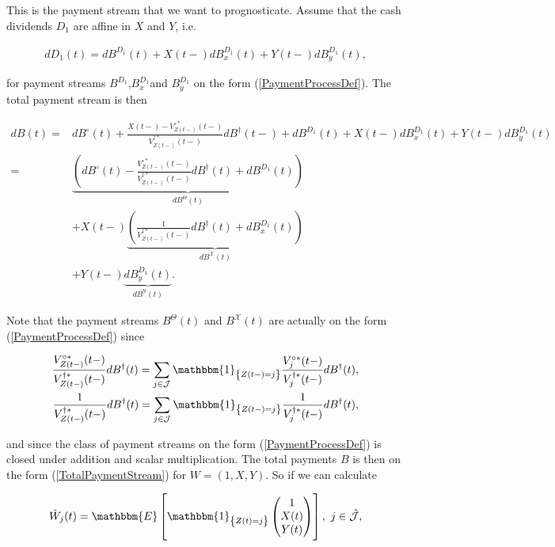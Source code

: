 \documentclass{article}
\newcommand{\1}[1]{\mathbbm{1}_{\left\lbrace #1 \right\rbrace}}
\newcommand{\expec}[1][def]{\mathbbm{E} \left[ #1 \right]}
\theoremstyle{break}
\theoremstyle{remark}
\numberwithin{equation}{section}
\begin{document}
This is the payment stream that we want to prognosticate. Assume that the cash dividends $D_1$ are affine in $X$ and $Y$, i.e.

\begin{align} \label{LinearCashDiv}
dD_1(t) = dB^{D_1}(t) + X(t-) dB_x^{D_1}(t) + Y(t-)dB_y^{D_1}(t),
\end{align}

for payment streams $B^{D_1}$,$B_x^{D_1}$and $B_y^{D_1}$ on the form (\ref{PaymentProcessDef}). The total payment stream is then

\begin{align}
dB(t) =& dB^\circ(t) + \frac{X(t-) - V_{Z(t-)}^{\circ*}(t-)}{V_{Z(t-)}^{\dagger*}(t-)} dB^\dagger(t-) + dB^{D_1}(t) + X(t-) dB_x^{D_1}(t) + Y(t-) dB_y^{D_1}(t) \nonumber \\
=& \underbrace{\left( dB^\circ(t) - \frac{V_{Z(t-)}^{\circ*}(t-)}{V_{Z(t-)}^{\dagger*}(t-)} dB^\dagger(t) + dB^{D_1}(t) \right)}_{dB^\Theta(t)} \label{FirstLine} \\
&+ X(t-) \underbrace{\left( \frac{1}{V_{Z(t-)}^{\dagger*}(t-)} dB^\dagger(t) + dB_x^{D_1}(t) \right)}_{dB^\mathcal{X}(t)} \label{SecondLine} \\
&+ Y(t-) \underbrace{dB_y^{D_1}(t)}_{dB^\mathcal{Y}(t)}. \label{ThirdLine}
\end{align}

Note that the payment streams $B^\Theta(t)$ and $B^\mathcal{X}(t)$ are actually on the form (\ref{PaymentProcessDef}) since

\begin{align*}
	\frac{V_{Z(t-)}^{\circ*}(t-)}{V_{Z(t-)}^{\dagger*}(t-)} dB^\dagger(t) = \sum_{j \in \mathcal{J}} \1{Z(t-)=j} \frac{V_{j}^{\circ*}(t-)}{V_{j}^{\dagger*}(t-)} dB^\dagger(t), \\
	\frac{1}{V_{Z(t-)}^{\dagger*}(t-)} dB^\dagger(t) = \sum_{j \in \mathcal{J}} \1{Z(t-)=j} \frac{1}{V_{j}^{\dagger*}(t-)} dB^\dagger(t),
\end{align*}

and since the class of payment streams on the form (\ref{PaymentProcessDef}) is closed under addition and scalar multiplication. The total payments $B$ is then on the form (\ref{TotalPaymentStream}) for $W=(1,X,Y)$. So if we can calculate
	
\begin{align*}
	\tilde{W}_j(t) = \expec[\1{Z(t)=j}\begin{pmatrix}1  \\ X(t) \\ Y(t)\end{pmatrix}], \, \, j \in \hat{\mathcal{J}},
\end{align*}
	
\end{document}
